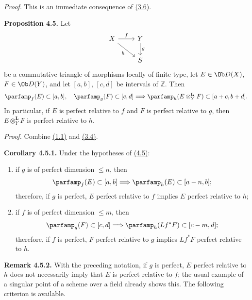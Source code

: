 \emph{Proof.} This is an immediate consequence of \hyperlink{sga6.e03.prop.3-6}{(3.6)}.

\textbf{Proposition 4.5.} Let
\[
\begin{tikzcd}
X \arrow[r,"f"] \arrow[dr,"h"'] & Y \arrow[d,"g"]\\
& S
\end{tikzcd}
\]
be a commutative triangle of morphisms locally of finite type, let \(E\in\Ob D(X)\), \(F\in\Ob D(Y)\), and let \([a,b]\), \([c,d]\) be intervals of \(\mathbb Z\). Then
\[
 \parfamp_f(E)\subset[a,b],\quad
 \parfamp_g(F)\subset[c,d]
 \Longrightarrow
 \parfamp_h(E\otimes_Y^{\mathbf L}F)
     \subset[a+c,b+d].
\]
In particular, if \(E\) is perfect relative to \(f\) and \(F\) is perfect relative to \(g\), then \(E\otimes_Y^{\mathbf L}F\) is perfect relative to \(h\).

\emph{Proof.} Combine \hyperlink{sga6.e03.thm.1-1}{(1.1)} and \hyperlink{sga6.e03.cor.3-4}{(3.4)}.

\textbf{Corollary 4.5.1.} Under the hypotheses of \hyperlink{sga6.e03.prop.4-5}{(4.5)}:
\begin{enumerate}[label=\alph*)]
\item if \(g\) is of perfect dimension \(\leq n\), then
\[
 \parfamp_f(E)
  \subset[a,b]
 \Longrightarrow
 \parfamp_h(E)
  \subset[a-n,b];
\]
therefore, if \(g\) is perfect, \(E\) perfect relative to \(f\) implies \(E\) perfect relative to \(h\);
\item if \(f\) is of perfect dimension \(\leq m\), then
\[
 \parfamp_g(F)
  \subset[c,d]
 \Longrightarrow
 \parfamp_h(Lf^*F)
  \subset[c-m,d];
\]
therefore, if \(f\) is perfect, \(F\) perfect relative to \(g\) implies \(Lf^*F\) perfect relative to \(h\).
\end{enumerate}

\textbf{Remark 4.5.2.} With the preceding notation, if \(g\) is perfect, \(E\) perfect relative to \(h\) does not necessarily imply that \(E\) is perfect relative to \(f\); the usual example of a singular point of a scheme over a field already shows this. The following criterion is available.

